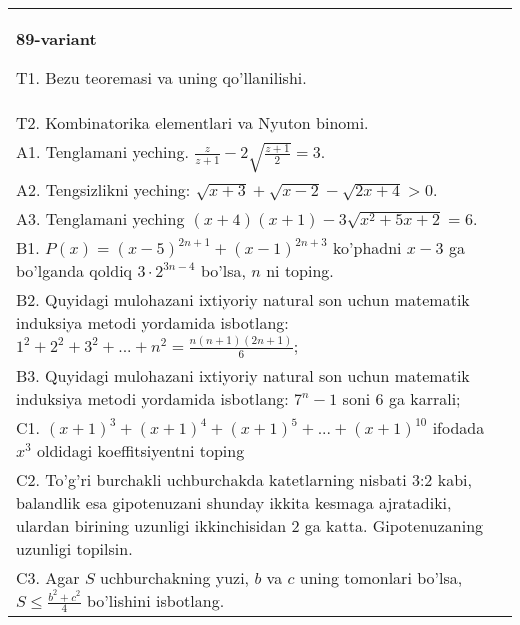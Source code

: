 \documentclass{article}
\begin{document}
\begin{tabular}{m{17cm}}
\textbf{89-variant}
\newline

T1. Bezu teoremasi va uning qo'llanilishi. \\
T2. Kombinatorika elementlari va Nyuton binomi. \\
A1. Tenglamani yeching. \(\frac{z}{z + 1} - 2\sqrt{\frac{z + 1}{2}} = 3\). \\
A2. Tengsizlikni yeching: \(\sqrt{x + 3} + \sqrt{x - 2} - \sqrt{2x + 4} > 0\). \\
A3. Tenglamani yeching \((x + 4)(x + 1) - 3\sqrt{x^{2} + 5x + 2} = 6\). \\
B1. \(P(x) = (x - 5)^{2n + 1} + (x - 1)^{2n + 3}\) ko'phadni \(x - 3\) ga bo'lganda qoldiq \(3 \cdot 2^{3n - 4}\) bo'lsa, \(n\) ni toping. \\
B2. Quyidagi mulohazani ixtiyoriy natural son uchun matematik induksiya metodi yordamida isbotlang: \(1^{2} + 2^{2} + 3^{2} + ... + n^{2} = \frac{n(n + 1)(2n + 1)}{6}\); \\
B3. Quyidagi mulohazani ixtiyoriy natural son uchun matematik induksiya metodi yordamida isbotlang: \(7^{n} - 1\) soni 6 ga karrali; \\
C1. \((x + 1)^{3} + (x + 1)^{4} + (x + 1)^{5} + ... + (x + 1)^{10}\) ifodada \(x^{3}\) oldidagi koeffitsiyentni toping \\
C2. To'g'ri burchakli uchburchakda katetlarning nisbati 3:2 kabi, balandlik esa gipotenuzani shunday ikkita kesmaga ajratadiki, ulardan birining uzunligi ikkinchisidan 2 ga katta. Gipotenuzaning uzunligi topilsin. \\
C3. Agar \(S\) uchburchakning yuzi, \(b\) va \(c\) uning tomonlari bo'lsa, \(S \leq \frac{b^{2} + c^{2}}{4}\) bo'lishini isbotlang. \\

\end{tabular}
\vspace{1cm}
\end{document}
